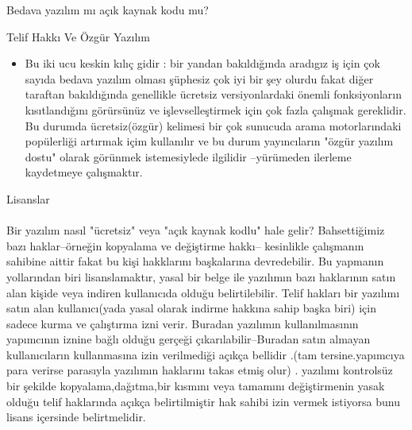 \documentclass[10pt,a5paper]{book}
\begin{document}
\begin{section}{Bedava yazılım mı açık kaynak kodu mu?}
\begin{subsection}{Telif Hakkı Ve Özgür Yazılım}
\begin{itemize}
 \paragraph{}{Özel yazılım geliştirmenin "geleneksel" modeli çerçevesinde, yazılımın orijinal üreticisi değişiklik yapma ve geliştirme hakkını elinde bulundurur. Böyle bir şirketin müşterisi olarak, üretici ürünü üretimden kaldırırsa yada düpedüz kaybolursa diye kaygılanabilirsiniz(iflas edebilir yada rakipleri tarafından satın alınabilir), çünkü bu büyük bir sorununuz var demektir ve geleceği olmayan bir yazılıma masraf yapmış olursunuz. Özgür yazılımda her zaman orjinal üreticilerden destek alacak birini bulursunuz--gerekirse diğer kullanıcılarla birlikte destek talep edebilirsiniz kimse yalnız kalmanızı istemez. Eğer bir paket yazılım satmak istiyorsanız önce FOSS seklinde bir temel sürüm hazırlayıp  insanları  daha gelişmiş özelliklere sahip “full versiyon” satın almaya ikna edebilirseniz , bu işi başarırsınız(jargonda ifadesi "Açık çekirdek").}
 \item Bu iki ucu keskin kılıç gidir : bir yandan bakıldığında aradıgız iş için çok sayıda bedava yazılım olması şüphesiz çok iyi bir şey olurdu fakat diğer taraftan bakıldığında genellikle ücretsiz versiyonlardaki önemli fonksiyonların kısıtlandığını görürsünüz ve işlevselleştirmek için çok fazla çalışmak gereklidir. Bu durumda ücretsiz(özgür) kelimesi bir çok sunucuda arama motorlarındaki popülerliği artırmak içim kullanılır ve bu durum yayıncıların "özgür yazılım dostu" olarak görünmek istemesiylede ilgilidir --yürümeden ilerleme kaydetmeye çalışmaktır.
 \end{itemize}
\end{subsection}
\begin{subsection}{Lisanslar}
\paragraph{}{Bir yazılım nasıl  "ücretsiz" veya "açık kaynak kodlu" hale gelir?  Bahsettiğimiz bazı haklar--örneğin kopyalama ve değiştirme hakkı-- kesinlikle çalışmanın sahibine aittir fakat bu kişi hakklarını başkalarına devredebilir. Bu yapmanın  yollarından biri lisanslamaktır, yasal bir belge ile yazılımın bazı haklarının satın alan kişide veya indiren kullanıcıda olduğu belirtilebilir. Telif hakları bir yazılımı satın alan kullanıcı(yada yasal olarak indirme hakkına sahip başka biri) için sadece kurma ve çalıştırma izni verir. Buradan yazılımın kullanılmasının yapımcının iznine bağlı olduğu gerçeği çıkarılabilir--Buradan satın almayan kullanıcıların kullanmasına izin verilmediği açıkça bellidir .(tam tersine.yapımcıya para verirse parasıyla yazılımın haklarını takas etmiş olur) . yazılımı kontrolsüz bir şekilde  kopyalama,dağıtma,bir kısmını veya tamamını değiştirmenin yasak olduğu telif haklarında açıkça belirtilmiştir hak sahibi izin vermek istiyorsa bunu lisans içersinde belirtmelidir.}

\end{subsection}
\end{section}
\end{document}
